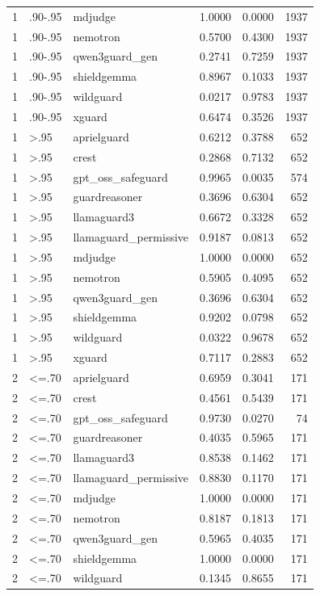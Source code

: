 \begin{tabular}{rllrrr}
1 & .90-.95 & mdjudge & 1.0000 & 0.0000 & 1937 \\
1 & .90-.95 & nemotron & 0.5700 & 0.4300 & 1937 \\
1 & .90-.95 & qwen3guard\_gen & 0.2741 & 0.7259 & 1937 \\
1 & .90-.95 & shieldgemma & 0.8967 & 0.1033 & 1937 \\
1 & .90-.95 & wildguard & 0.0217 & 0.9783 & 1937 \\
1 & .90-.95 & xguard & 0.6474 & 0.3526 & 1937 \\
1 & >.95 & aprielguard & 0.6212 & 0.3788 & 652 \\
1 & >.95 & crest & 0.2868 & 0.7132 & 652 \\
1 & >.95 & gpt\_oss\_safeguard & 0.9965 & 0.0035 & 574 \\
1 & >.95 & guardreasoner & 0.3696 & 0.6304 & 652 \\
1 & >.95 & llamaguard3 & 0.6672 & 0.3328 & 652 \\
1 & >.95 & llamaguard\_permissive & 0.9187 & 0.0813 & 652 \\
1 & >.95 & mdjudge & 1.0000 & 0.0000 & 652 \\
1 & >.95 & nemotron & 0.5905 & 0.4095 & 652 \\
1 & >.95 & qwen3guard\_gen & 0.3696 & 0.6304 & 652 \\
1 & >.95 & shieldgemma & 0.9202 & 0.0798 & 652 \\
1 & >.95 & wildguard & 0.0322 & 0.9678 & 652 \\
1 & >.95 & xguard & 0.7117 & 0.2883 & 652 \\
2 & <=.70 & aprielguard & 0.6959 & 0.3041 & 171 \\
2 & <=.70 & crest & 0.4561 & 0.5439 & 171 \\
2 & <=.70 & gpt\_oss\_safeguard & 0.9730 & 0.0270 & 74 \\
2 & <=.70 & guardreasoner & 0.4035 & 0.5965 & 171 \\
2 & <=.70 & llamaguard3 & 0.8538 & 0.1462 & 171 \\
2 & <=.70 & llamaguard\_permissive & 0.8830 & 0.1170 & 171 \\
2 & <=.70 & mdjudge & 1.0000 & 0.0000 & 171 \\
2 & <=.70 & nemotron & 0.8187 & 0.1813 & 171 \\
2 & <=.70 & qwen3guard\_gen & 0.5965 & 0.4035 & 171 \\
2 & <=.70 & shieldgemma & 1.0000 & 0.0000 & 171 \\
2 & <=.70 & wildguard & 0.1345 & 0.8655 & 171 \\

\end{tabular}
